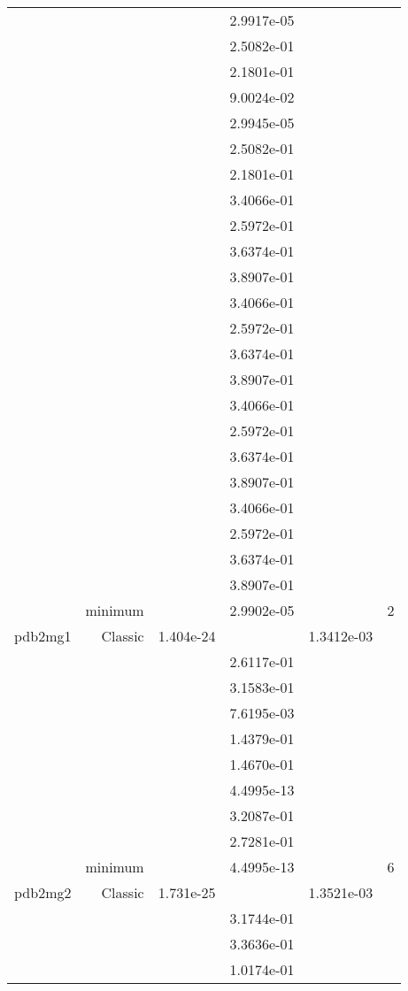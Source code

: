 \begin{xltabular}{\textwidth}{r|rS[table-format=1.3e+2]S[table-format=1.4e+2]S[table-format=1.4e+2]S[table-format=-1.5]}
&  &  & 2.9917e-05 & & \\
&  &  & 2.5082e-01 & & \\
&  &  & 2.1801e-01 & & \\
&  &  & 9.0024e-02 & & \\
&  &  & 2.9945e-05 & & \\
&  &  & 2.5082e-01 & & \\
&  &  & 2.1801e-01 & & \\
&  &  & 3.4066e-01 & & \\
&  &  & 2.5972e-01 & & \\
&  &  & 3.6374e-01 & & \\
&  &  & 3.8907e-01 & & \\
&  &  & 3.4066e-01 & & \\
&  &  & 2.5972e-01 & & \\
&  &  & 3.6374e-01 & & \\
&  &  & 3.8907e-01 & & \\
&  &  & 3.4066e-01 & & \\
&  &  & 2.5972e-01 & & \\
&  &  & 3.6374e-01 & & \\
&  &  & 3.8907e-01 & & \\
&  &  & 3.4066e-01 & & \\
&  &  & 2.5972e-01 & & \\
&  &  & 3.6374e-01 & & \\
&  &  & 3.8907e-01 & & \\
& minimum &  & 2.9902e-05 & & 2 \\  \addlinespace
pdb2mg1 & Classic & 1.404e-24 &  & 1.3412e-03 & \\
&  &  & 2.6117e-01 & & \\
&  &  & 3.1583e-01 & & \\
&  &  & 7.6195e-03 & & \\
&  &  & 1.4379e-01 & & \\
&  &  & 1.4670e-01 & & \\
&  &  & 4.4995e-13 & & \\
&  &  & 3.2087e-01 & & \\
&  &  & 2.7281e-01 & & \\
& minimum &  & 4.4995e-13 & & 6 \\  \addlinespace
pdb2mg2 & Classic & 1.731e-25 &  & 1.3521e-03 & \\
&  &  & 3.1744e-01 & & \\
&  &  & 3.3636e-01 & & \\
&  &  & 1.0174e-01 & & \\

\end{xltabular}
